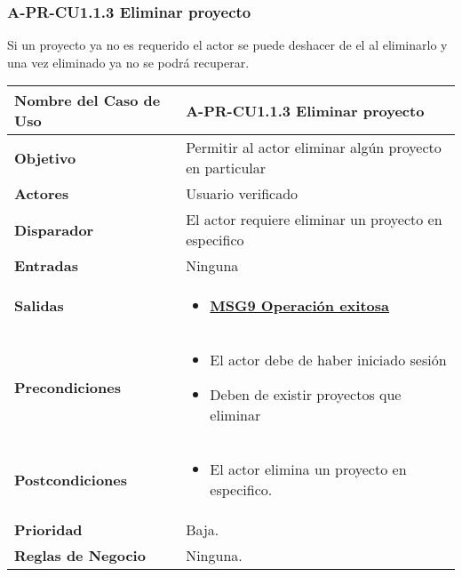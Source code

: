 \subsubsection{A-PR-CU1.1.3 Eliminar proyecto}
Si un proyecto ya no es requerido el actor se puede deshacer de el al eliminarlo y una vez eliminado ya no se podrá recuperar.
\begin{longtable}{|J{5cm}|J{10.3cm}|}
	\hline
	\textbf{Nombre del Caso de Uso} &
		A-PR-CU1.1.3 Eliminar proyecto \\ \hline
	\textbf{Objetivo} &
		Permitir al actor eliminar algún proyecto en particular \\ \hline
	\textbf{Actores} &
		Usuario verificado \\ \hline 
	\textbf{Disparador} & 
		El actor requiere eliminar un proyecto en especifico \\ \hline 
	\textbf{Entradas} & 
		Ninguna \\ \hline 
	\textbf{Salidas} & 
		\begin{itemize}
		    \item \hyperref[MSG9]{\bf MSG9 Operación exitosa}
		\end{itemize} \\ \hline
	\textbf{Precondiciones} &
		\begin{itemize}
				\item El actor debe de haber iniciado sesión
				\item Deben de existir proyectos que eliminar
		\end{itemize} \\ \hline
	\textbf{Postcondiciones} &
		\begin{itemize}
			\item El actor elimina un proyecto en especifico.
		\end{itemize}\\ \hline
	\textbf{Prioridad} & 
		Baja. \\ \hline
	\textbf{Reglas de Negocio} & 
		Ninguna. \\ \hline

\end{longtable}
